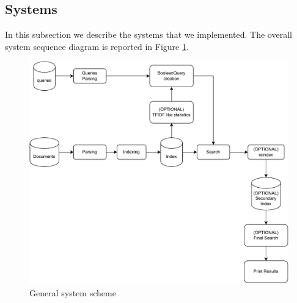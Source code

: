 \subsection{Systems}
\label{subsec:systems}
In this subsection we describe the systems that we implemented. The overall system sequence diagram is reported in Figure \ref{fig:overallsys}.

\begin{figure}[h]
    \centering
    \includegraphics[scale=0.8]{figure/overallsystem.pdf}
    \caption{General system scheme}
    \label{fig:overallsys}
\end{figure}

